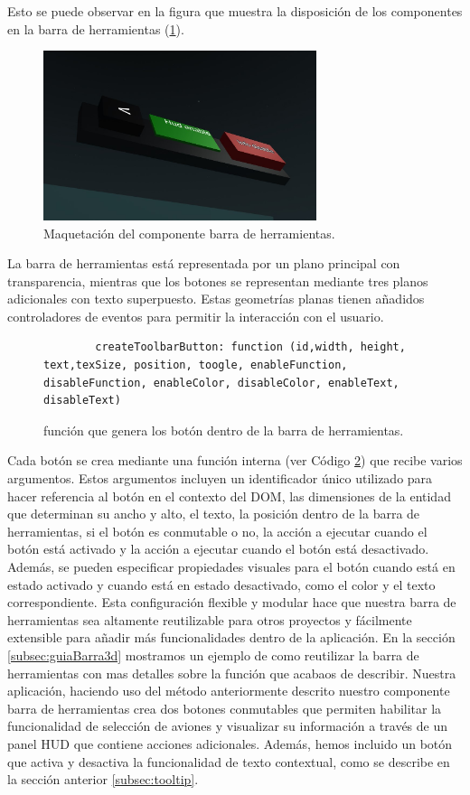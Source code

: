 \documentclass[a4paper, 11pt]{book}
\begin{document}
Esto se puede observar en la figura que muestra la disposición de los componentes en la barra de herramientas (\ref{fig:toolbarComposition}).
\begin{figure}[h]
	\centering
	\includegraphics[width=8cm, keepaspectratio]{img/toolbarElementos.jpg}
	\caption{Maquetación del componente barra de herramientas.}
	\label{fig:toolbarComposition}
\end{figure}
La barra de herramientas está representada por un plano principal con transparencia, mientras que los botones se representan mediante tres planos adicionales con texto superpuesto. Estas geometrías planas tienen añadidos controladores de eventos para permitir la interacción con el usuario.\\
\begin{figure}[h]
	\centering
	\begin{verbatim}
		createToolbarButton: function (id,width, height, text,texSize, position, toogle, enableFunction, disableFunction, enableColor, disableColor, enableText, disableText)
	\end{verbatim}
	\caption{función que genera los botón dentro de la barra de herramientas.
		\label{codigo:crearBoton}
	}
\end{figure}
Cada botón se crea mediante una función interna (ver Código \ref{codigo:crearBoton}) que recibe varios argumentos. Estos argumentos incluyen un identificador único utilizado para hacer referencia al botón en el contexto del \textsc{\gls{DOM}}, las dimensiones de la entidad que determinan su ancho y alto, el texto, la posición dentro de la barra de herramientas, si el botón es conmutable o no, la acción a ejecutar cuando el botón está activado y la acción a ejecutar cuando el botón está desactivado.
Además, se pueden especificar propiedades visuales para el botón cuando está en estado activado y cuando está en estado desactivado, como el color y el texto correspondiente. Esta configuración flexible y modular hace que nuestra barra de herramientas sea altamente reutilizable para otros proyectos y fácilmente extensible para añadir más funcionalidades dentro de la aplicación.
En la sección \ref{subsec:guiaBarra3d} mostramos un ejemplo de como reutilizar la barra de herramientas con mas detalles sobre la función que acabaos de describir.
Nuestra aplicación, haciendo uso del método anteriormente descrito nuestro componente barra de herramientas crea dos botones conmutables que permiten habilitar la funcionalidad de selección de aviones y visualizar su información a través de un panel \textsc{\gls{HUD}} que contiene acciones adicionales. Además, hemos incluido un botón que activa y desactiva la funcionalidad de texto contextual, como se describe en la sección anterior \ref{subsec:tooltip}.
\end{document}
